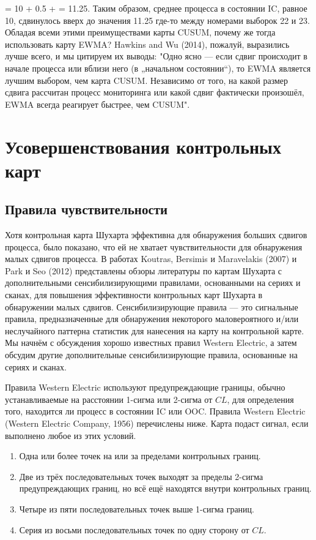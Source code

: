  = 10 + 0.5 +  = 11.25\). Таким образом, среднее процесса в состоянии IC, равное 10, сдвинулось вверх до значения 11.25 где-то между номерами выборок 22 и 23. Обладая всеми этими преимуществами карты CUSUM, почему же тогда использовать карту EWMA? Hawkins and Wu (2014), пожалуй, выразились лучше всего, и мы цитируем их выводы: "Одно ясно — если сдвиг происходит в начале процесса или вблизи него (в „начальном состоянии“), то EWMA является лучшим выбором, чем карта CUSUM. Независимо от того, на какой размер сдвига рассчитан процесс мониторинга или какой сдвиг фактически произошёл, EWMA всегда реагирует быстрее, чем CUSUM".

\section{Усовершенствования контрольных карт}

\subsection{Правила чувствительности}

Хотя контрольная карта Шухарта эффективна для обнаружения больших сдвигов процесса, было показано, что ей не хватает чувствительности для обнаружения малых сдвигов процесса. В работах Koutras, Bersimis и Maravelakis (2007) и Park и Seo (2012) представлены обзоры литературы по картам Шухарта с дополнительными сенсибилизирующими правилами, основанными на сериях и сканах, для повышения эффективности контрольных карт Шухарта в обнаружении малых сдвигов. Сенсибилизирующие правила — это сигнальные правила, предназначенные для обнаружения некоторого маловероятного и/или неслучайного паттерна статистик для нанесения на карту на контрольной карте. Мы начнём с обсуждения хорошо известных правил Western Electric, а затем обсудим другие дополнительные сенсибилизирующие правила, основанные на сериях и сканах.

Правила Western Electric используют предупреждающие границы, обычно устанавливаемые на расстоянии 1-сигма или 2-сигма от \(CL\), для определения того, находится ли процесс в состоянии IC или OOC. Правила Western Electric (Western Electric Company, 1956) перечислены ниже. Карта подаст сигнал, если выполнено любое из этих условий.

\begin{enumerate}
	\item Одна или более точек на или за пределами контрольных границ.
	\item Две из трёх последовательных точек выходят за пределы 2-сигма предупреждающих границ, но всё ещё находятся внутри контрольных границ.
	\item Четыре из пяти последовательных точек выше 1-сигма границ.
	\item Серия из восьми последовательных точек по одну сторону от \(CL\).
\end{enumerate}

